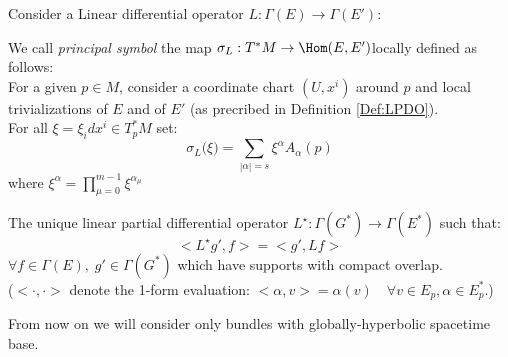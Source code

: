 \documentclass[Main]{subfiles}
\begin{document}
			Consider a Linear differential operator $L: \Gamma(E) \rightarrow \Gamma(E')$:
			\begin{definition}
			 	We call \emph{principal symbol} the map $\sigma_L: T^*M \rightarrow \Hom(E,E') $locally defined as follows: \\
			 	For a given $p\in M$, consider a coordinate chart $(U, x^i)$ around $p$ and local trivializations of $E$ and of $E'$ (as precribed in Definition \ref{Def:LPDO}).
			 	\\ 
			 	For all $\xi = \xi_i dx^i \in T^*_pM$ set:
			 	\begin{displaymath}
			 		\sigma_L \big(\xi \big) = \sum_{|\alpha|=s}  \xi^\alpha A_\alpha (p) 
			 	\end{displaymath}
			 	where $ \xi^\alpha = \prod_{\mu=0}^{m-1} \xi^{\alpha_\mu}$
			 \end{definition}
			\begin{definition}
				The unique linear partial differential operator $L^\star: \Gamma(G^*) \rightarrow \Gamma(E^*)$ such that:
				\begin{displaymath}
					<L^\star g' , f > = <g', L f> 
				\end{displaymath}
				$\forall f\in \Gamma(E),\; g' \in \Gamma(G^*)$ which have supports with compact overlap.
				\\
				($<\cdot,\cdot>$ denote the 1-form evaluation: $<\alpha,v>= \alpha(v) \quad \forall v\in E_p, \alpha \in E^*_p$.)
			\end{definition}
			\begin{NB}
			
				From now on we will consider only bundles with globally-hyperbolic spacetime base.
			\end{NB}			
		
\end{document}
